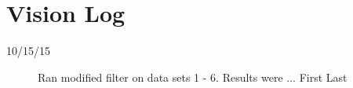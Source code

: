 \section{Vision Log}

\begin{description}
\item [10/15/15]  Ran modified filter on data sets 1 - 6.  Results were ... \hfill{First Last}
\end{description}